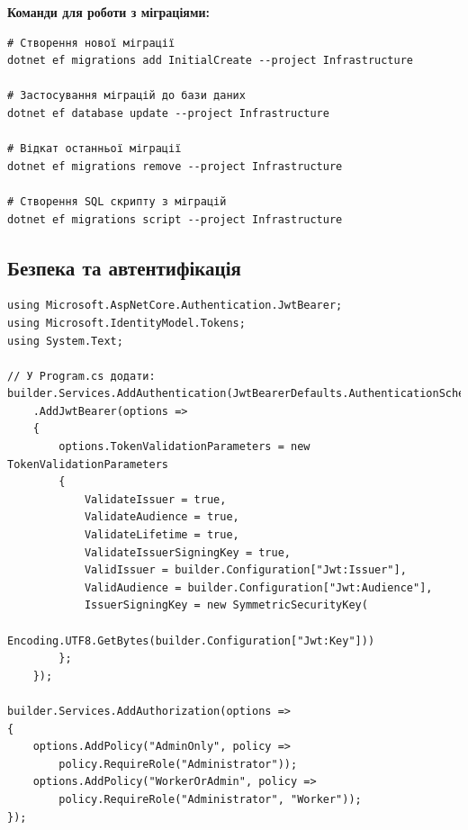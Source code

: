 \documentclass[14pt,a4paper]{extarticle}
\begin{document}
\textbf{Команди для роботи з міграціями:}

\begin{verbatim}
# Створення нової міграції
dotnet ef migrations add InitialCreate --project Infrastructure

# Застосування міграцій до бази даних
dotnet ef database update --project Infrastructure

# Відкат останньої міграції
dotnet ef migrations remove --project Infrastructure

# Створення SQL скрипту з міграцій
dotnet ef migrations script --project Infrastructure
\end{verbatim}

\newpage
\subsection{Безпека та автентифікація}

\begin{lstlisting}[language={[Sharp]C}, caption=JWT автентифікація, basicstyle=\small\ttfamily, breaklines=true, frame=single]
using Microsoft.AspNetCore.Authentication.JwtBearer;
using Microsoft.IdentityModel.Tokens;
using System.Text;

// У Program.cs додати:
builder.Services.AddAuthentication(JwtBearerDefaults.AuthenticationScheme)
    .AddJwtBearer(options =>
    {
        options.TokenValidationParameters = new TokenValidationParameters
        {
            ValidateIssuer = true,
            ValidateAudience = true,
            ValidateLifetime = true,
            ValidateIssuerSigningKey = true,
            ValidIssuer = builder.Configuration["Jwt:Issuer"],
            ValidAudience = builder.Configuration["Jwt:Audience"],
            IssuerSigningKey = new SymmetricSecurityKey(
                Encoding.UTF8.GetBytes(builder.Configuration["Jwt:Key"]))
        };
    });

builder.Services.AddAuthorization(options =>
{
    options.AddPolicy("AdminOnly", policy => 
        policy.RequireRole("Administrator"));
    options.AddPolicy("WorkerOrAdmin", policy => 
        policy.RequireRole("Administrator", "Worker"));
});
\end{lstlisting}
\end{document}
